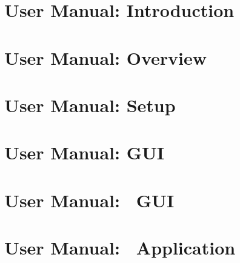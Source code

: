 \chapter[DABC User Manual: Introduction]{\dabc\ User Manual: Introduction}
 \cleardoublepage
\chapter[DABC User Manual: Overview]{\dabc\ User Manual: Overview}
 \cleardoublepage
\chapter[DABC User Manual: Setup]{\dabc\ User Manual: Setup}
 \cleardoublepage
\chapter[DABC User Manual: GUI]{\dabc\ User Manual: GUI}
 \cleardoublepage
\chapter[DABC User Manual: MBS GUI]{\dabc\ User Manual: \mbs\ GUI}
 \cleardoublepage
\chapter[DABC User Manual: DABC Application MBS]{\dabc\ User Manual: \dabc\ Application \mbs}
 \cleardoublepage

